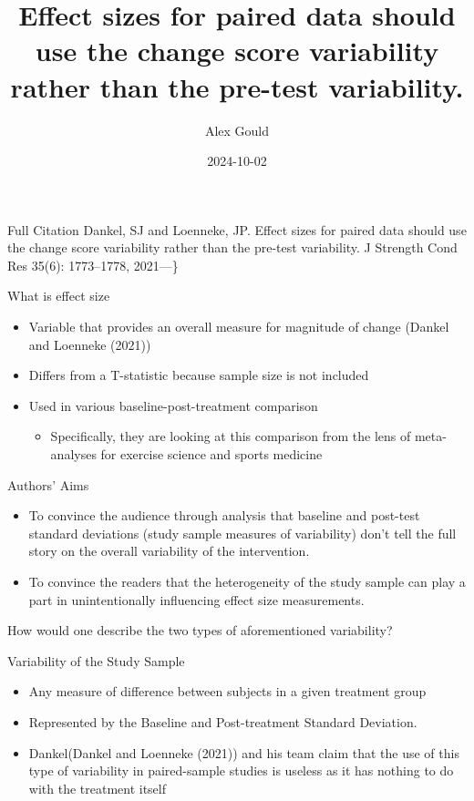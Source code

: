 \documentclass[
  ignorenonframetext,
  aspectratio=169,
]{beamer}
\title{Effect sizes for paired data should use the change score
variability rather than the pre-test variability.}
\author{Alex Gould}
\date{2024-10-02}
\providecommand{\tightlist}{%
  \setlength{\itemsep}{0pt}\setlength{\parskip}{0pt}}
\begin{document}
\frame{\titlepage}

\begin{frame}{Full Citation}
\protect\hypertarget{full-citation}{}
Dankel, SJ and Loenneke, JP. Effect sizes for paired data should use the
change score variability rather than the pre-test variability. J
Strength Cond Res 35(6): 1773--1778, 2021---\}
\end{frame}

\begin{frame}{What is effect size}
\protect\hypertarget{what-is-effect-size}{}
\begin{itemize}
\tightlist
\item
  Variable that provides an overall measure for magnitude of change
  (Dankel and Loenneke (2021))
\item
  Differs from a T-statistic because sample size is not included
\item
  Used in various baseline-post-treatment comparison

  \begin{itemize}
  \tightlist
  \item
    Specifically, they are looking at this comparison from the lens of
    meta-analyses for exercise science and sports medicine
  \end{itemize}
\end{itemize}
\end{frame}

\begin{frame}{Authors' Aims}
\protect\hypertarget{authors-aims}{}
\begin{itemize}
\tightlist
\item
  To convince the audience through analysis that baseline and post-test
  standard deviations (study sample measures of variability) don't tell
  the full story on the overall variability of the intervention.
\item
  To convince the readers that the heterogeneity of the study sample can
  play a part in unintentionally influencing effect size measurements.
\end{itemize}

How would one describe the two types of aforementioned variability?
\end{frame}

\begin{frame}{Variability of the Study Sample}
\protect\hypertarget{variability-of-the-study-sample}{}
\begin{itemize}
\tightlist
\item
  Any measure of difference between subjects in a given treatment group
\item
  Represented by the Baseline and Post-treatment Standard Deviation.
\item
  Dankel(Dankel and Loenneke (2021)) and his team claim that the use of
  this type of variability in paired-sample studies is useless as it has
  nothing to do with the treatment itself
\end{itemize}
\end{frame}
\end{document}
